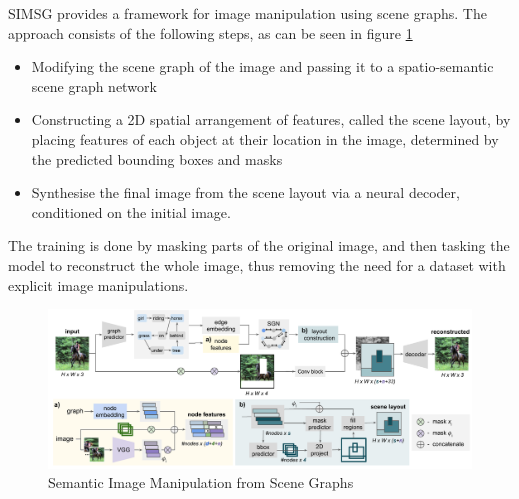 SIMSG provides a framework for image manipulation using scene graphs. The approach consists of the following steps, as can be seen in figure \ref{fig:simsg}
\begin{itemize}
    \item Modifying the scene graph of the image and passing it to a spatio-semantic scene graph network
    \item Constructing a 2D spatial arrangement of features, called the scene layout, by placing features of each object at their location in the image, determined by the predicted bounding boxes and masks
    \item Synthesise the final image from the scene layout via a neural decoder, conditioned on the initial image. 
\end{itemize}
The training is done by masking parts of the original image, and then tasking the model to reconstruct the whole image, thus removing the need for a dataset with explicit image manipulations.

\begin{figure}
    \centering
    \includegraphics[width=\textwidth]{assets/simsg.png}
    \caption{Semantic Image Manipulation from Scene Graphs}
    \label{fig:simsg}
\end{figure}
